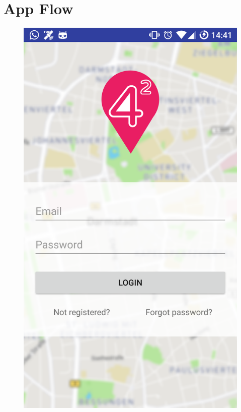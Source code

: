 \documentclass[11pt, accentcolor=tud1c]{tudreport}
\begin{document}
\section{App Flow}
\begin{figure}[h]
\centering
\begin{minipage}{.3\textwidth}
  \centering
  \includegraphics[width=.8\linewidth]{./res/login.png}
  \label{fig:login_view}
\end{minipage}%
\begin{minipage}{.3\textwidth}
  \centering

\end{minipage}
\end{figure}
\end{document}
